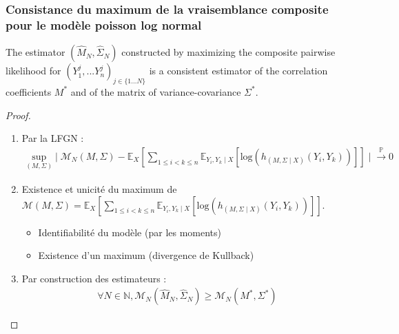 \documentclass[11pt,table]{beamer}
\begin{document}
\begin{frame}
\frametitle{Consistance du maximum de la vraisemblance composite pour le modèle poisson log normal}
\begin{theorem}
The estimator $(\widehat{M}_N,\widehat{\Sigma}_N)$ constructed by maximizing the composite pairwise likelihood for $(Y^j_1,...Y^j_n)_{j \in \{1...N\}}$ is a consistent estimator of the correlation coefficients $M^\ast$ and of the matrix of variance-covariance $\Sigma^\ast$.
\end{theorem}
\end{frame}
\begin{frame}
\begin{proof}
\begin{enumerate}
\item Par la LFGN :
\begin{align*}
\underset{(M,\Sigma)}{\mathrm{sup}} \mid \mathcal{M}_N(M, \Sigma)- \mathbb{E}_X [\sum_{1 \leq i <k \leq n} \mathbb{E}_{Y_i,Y_k \mid X} [ \mathrm{log}(h_{(M,\Sigma \mid X)} (Y_i,Y_k))]] \mid\overset{\mathbb{P}}{\longrightarrow}  0
\end{align*} 
\item Existence et unicité du maximum de $\mathcal{M}(M,\Sigma) = \mathbb{E}_X [\sum_{1 \leq i < k \leq n} \mathbb{E}_{Y_i,Y_k \mid X} [ \mathrm{log}(h_{(M,\Sigma \mid X)} (Y_i,Y_k))]]$.
\begin{itemize}
\item Identifiabilité du modèle (par les moments)
\item Existence d'un maximum (divergence de Kullback)
\end{itemize}
\item Par construction des estimateurs : 
\begin{align*}
\forall N \in \mathbb{N},  \mathcal{M}_N(\widehat{M}_N, \widehat{\Sigma}_N) \geq \mathcal{M}_N(M^\ast, \Sigma^\ast) 
\end{align*}
\end{enumerate}
\end{proof}
\end{frame}
\end{document}
